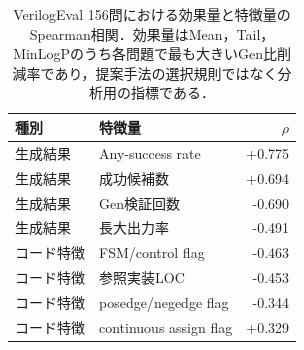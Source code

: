 \begin{table}[t]
\caption{VerilogEval 156問における効果量と特徴量のSpearman相関．効果量はMean，Tail，MinLogPのうち各問題で最も大きいGen比削減率であり，提案手法の選択規則ではなく分析用の指標である．}
\label{tab:verilog_eval_correlation}
\centering
\small
\setlength{\tabcolsep}{4pt}
\begin{tabular}{@{}llr@{}}
\hline
種別 & 特徴量 & $\rho$ \\
\hline
生成結果 & Any-success rate & +0.775 \\
生成結果 & 成功候補数 & +0.694 \\
生成結果 & Gen検証回数 & -0.690 \\
生成結果 & 長大出力率 & -0.491 \\
コード特徴 & FSM/control flag & -0.463 \\
コード特徴 & 参照実装LOC & -0.453 \\
コード特徴 & posedge/negedge flag & -0.344 \\
コード特徴 & continuous assign flag & +0.329 \\
\hline
\end{tabular}
\end{table}
